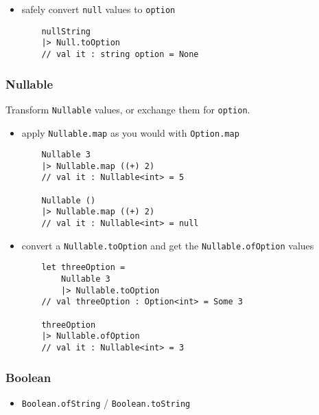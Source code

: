 \documentclass{article}
\begin{document}
\begin{itemize}

\item safely convert \texttt{null} values to \texttt{option}
\begin{verbatim}
    nullString
    |> Null.toOption
    // val it : string option = None
\end{verbatim}

\end{itemize}

\subsubsection{Nullable}

Transform \texttt{Nullable} values, or exchange them for \texttt{option}.

\begin{itemize}

\item apply \texttt{Nullable.map} as you would with \texttt{Option.map}
\begin{verbatim}
    Nullable 3
    |> Nullable.map ((+) 2)
    // val it : Nullable<int> = 5
    
    Nullable ()
    |> Nullable.map ((+) 2)
    // val it : Nullable<int> = null
\end{verbatim}

\item convert a \texttt{Nullable.toOption} and get the \texttt{Nullable.ofOption} values
\begin{verbatim}
    let threeOption =
        Nullable 3
        |> Nullable.toOption
    // val threeOption : Option<int> = Some 3
    
    threeOption
    |> Nullable.ofOption
    // val it : Nullable<int> = 3
\end{verbatim}

\end{itemize}

\subsubsection{Boolean}

\begin{itemize}
\item \texttt{Boolean.ofString} / \texttt{Boolean.toString}
\end{itemize}
\end{document}
